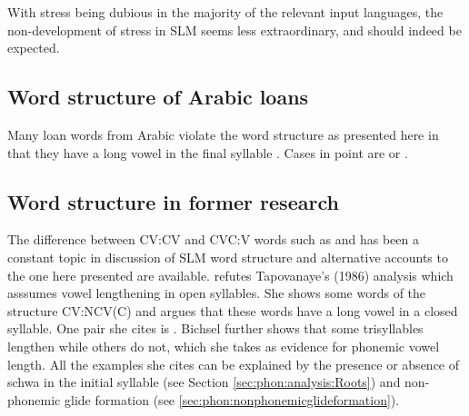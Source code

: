 With stress being dubious in the majority of the relevant input languages, the non-development of stress in SLM seems less extraordinary, and should indeed be expected.



\subsection{Word structure of Arabic loans}\label{sec:phon:WordstructureofArabicloans}
Many loan words from Arabic violate the word structure as presented here in that they have a long vowel in the final syllable \citep[54,69]{Bichsel}. Cases in point are  or .


\subsection{Word structure in former research}\label{sec:phon:Wordstructureinformerresearch} 
The difference between CV:CV and CVC:V words such as  and  has been a constant topic in discussion of SLM word structure and alternative accounts to the one here presented are available. \citet{Bichsel} refutes Tapovanaye's (1986) \nocite{Tapovanaye1986} analysis which asssumes vowel lengthening in open syllables. She shows some words of the structure CV:NCV(C) and argues that these words have a long vowel in a closed syllable. One pair she cites is  .
Bichsel further shows that some trisyllables lengthen while others do not, which she takes as evidence for phonemic vowel length. All the examples she cites can be explained by the presence or absence of schwa in the initial syllable (see Section \ref{sec:phon:analysis:Roots}) and non-phonemic glide formation (see \ref{sec:phon:nonphonemicglideformation}).

